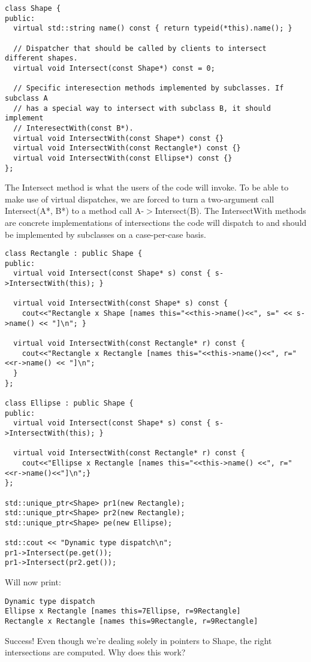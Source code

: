 \documentclass{book}
\begin{document}
\begin{lstlisting}
class Shape {
public:
  virtual std::string name() const { return typeid(*this).name(); }

  // Dispatcher that should be called by clients to intersect different shapes.
  virtual void Intersect(const Shape*) const = 0;

  // Specific interesection methods implemented by subclasses. If subclass A
  // has a special way to intersect with subclass B, it should implement
  // InteresectWith(const B*).
  virtual void IntersectWith(const Shape*) const {}
  virtual void IntersectWith(const Rectangle*) const {}
  virtual void IntersectWith(const Ellipse*) const {}
};
\end{lstlisting}
The Intersect method is what the users of the code will invoke.
To be able to make use of virtual dispatches, we are forced to turn a two-argument call Intersect(A*, B*) to a method call A-$>$Intersect(B).
The IntersectWith methods are concrete implementations of intersections the code will dispatch to and should be implemented by subclasses on a case-per-case basis.

\begin{lstlisting}
class Rectangle : public Shape {
public:
  virtual void Intersect(const Shape* s) const { s->IntersectWith(this); }

  virtual void IntersectWith(const Shape* s) const {
    cout<<"Rectangle x Shape [names this="<<this->name()<<", s=" << s->name() << "]\n"; }

  virtual void IntersectWith(const Rectangle* r) const {
    cout<<"Rectangle x Rectangle [names this="<<this->name()<<", r="<<r->name() << "]\n";
  }
};

class Ellipse : public Shape {
public:
  virtual void Intersect(const Shape* s) const { s->IntersectWith(this); }

  virtual void IntersectWith(const Rectangle* r) const {
    cout<<"Ellipse x Rectangle [names this="<<this->name() <<", r="<<r->name()<<"]\n";}
};

std::unique_ptr<Shape> pr1(new Rectangle);
std::unique_ptr<Shape> pr2(new Rectangle);
std::unique_ptr<Shape> pe(new Ellipse);

std::cout << "Dynamic type dispatch\n";
pr1->Intersect(pe.get());
pr1->Intersect(pr2.get());
\end{lstlisting}
Will now print:

\begin{verbatim}
Dynamic type dispatch
Ellipse x Rectangle [names this=7Ellipse, r=9Rectangle]
Rectangle x Rectangle [names this=9Rectangle, r=9Rectangle]
\end{verbatim}
Success! Even though we're dealing solely in pointers to Shape, the right intersections are computed. Why does this work?
\end{document}

